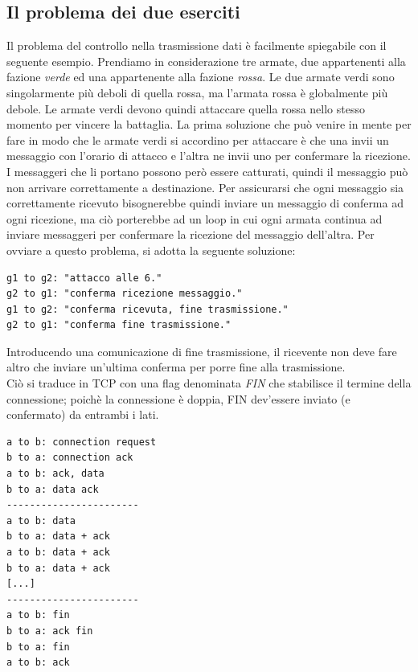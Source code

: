 \subsection{Il problema dei due eserciti}
Il problema del controllo nella trasmissione dati è facilmente spiegabile con il seguente esempio.
Prendiamo in considerazione tre armate, due appartenenti alla fazione \textit{verde} ed una appartenente alla fazione \textit{rossa}. Le due armate verdi sono singolarmente più deboli di quella rossa, ma l'armata rossa è globalmente più debole. Le armate verdi devono quindi attaccare quella rossa nello stesso momento per vincere la battaglia. La prima soluzione che può venire in mente per fare in modo che le armate verdi si accordino per attaccare è che una invii un messaggio con l'orario di attacco e l'altra ne invii uno per confermare la ricezione.\\
I messaggeri che li portano possono però essere catturati, quindi il messaggio può non arrivare correttamente a destinazione. Per assicurarsi che ogni messaggio sia correttamente ricevuto bisognerebbe quindi inviare un messaggio di conferma ad ogni ricezione, ma ciò porterebbe ad un loop in cui ogni armata continua ad inviare messaggeri per confermare la ricezione del messaggio dell'altra.
Per ovviare a questo problema, si adotta la seguente soluzione:
\begin{lstlisting}
g1 to g2: "attacco alle 6."
g2 to g1: "conferma ricezione messaggio."
g1 to g2: "conferma ricevuta, fine trasmissione."
g2 to g1: "conferma fine trasmissione."
\end{lstlisting}
Introducendo una comunicazione di fine trasmissione, il ricevente non deve fare altro che inviare un'ultima conferma per porre fine alla trasmissione.\\
Ciò si traduce in TCP con una flag denominata \textit{FIN} che stabilisce il termine della connessione; poichè la connessione è doppia, FIN dev'essere inviato (e confermato) da entrambi i lati.

\begin{lstlisting}
a to b: connection request
b to a: connection ack
a to b: ack, data
b to a: data ack
-----------------------
a to b: data
b to a: data + ack
a to b: data + ack
b to a: data + ack
[...]
-----------------------
a to b: fin
b to a: ack fin
b to a: fin
a to b: ack
\end{lstlisting}


